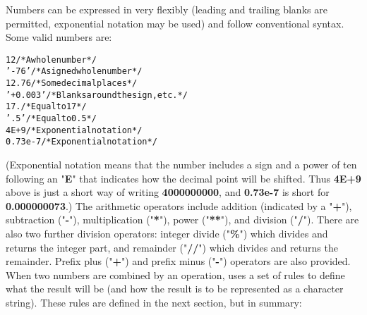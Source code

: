 Numbers can be expressed in \nr{} very flexibly (leading and trailing
blanks are permitted, exponential notation may be used) and follow
conventional syntax.
Some valid numbers are:
\begin{alltt}
     12          /* A whole number               */
   '-76'         /* A signed whole number        */
     12.76       /* Some decimal places          */
 ' +  0.003 '    /* Blanks around the sign, etc. */
     17.         /* Equal to 17                  */
      '.5'       /* Equal to 0.5                 */
     4E+9        /* Exponential notation         */
      0.73e-7    /* Exponential notation         */
\end{alltt}
(Exponential notation means that the number includes a sign and a power
of ten following an "\textbf{E}" that indicates how the decimal
point will be shifted.  Thus \textbf{4E+9} above is just a short way
of writing \textbf{4000000000}, and \textbf{0.73e-7} is short
for \textbf{0.000000073}.)
 The arithmetic operators include
addition (indicated by a "\textbf{+}"),
subtraction ("\textbf{-}"),
multiplication ("\textbf{*}"),
power ("\textbf{**}"), and
division ("\textbf{/}").
There are also two further division operators:
integer divide ("\textbf{\%}") which divides and returns the integer part, and
remainder ("\textbf{//}") which divides and returns the remainder.
Prefix plus ("\textbf{+}") and
prefix minus ("\textbf{-}") operators are also provided.
 When two numbers are combined by an operation, \nr{} uses a set of
rules to define what the result will be (and how the result is to be
represented as a character string).
These rules are defined in the next section, but in summary:
